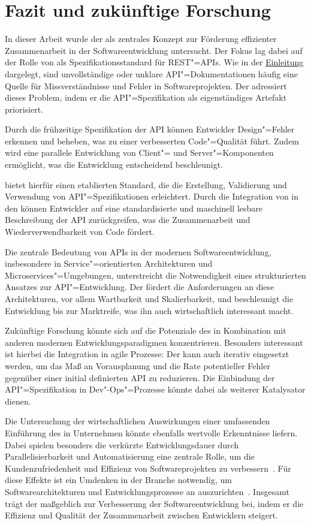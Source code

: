 \chapter{Fazit und zukünftige Forschung}
In dieser Arbeit wurde der \AFA als zentrales Konzept zur Förderung effizienter Zusammenarbeit in der Softwareentwicklung untersucht.
Der Fokus lag dabei auf der Rolle von \OA als Spezifikationsstandard für \ac{REST}"=\acp{API}.
Wie in der \hyperref[ch:introduction]{Einleitung} dargelegt, sind unvollständige oder unklare \ac{API}"=Dokumentationen häufig eine Quelle für Missverständnisse und Fehler in Softwareprojekten.
Der \AFA adressiert dieses Problem, indem er die \ac{API}"=Spezifikation als eigenständiges Artefakt priorisiert.

Durch die frühzeitige Spezifikation der \ac{API} können Entwickler Design"=Fehler erkennen und beheben, was zu einer verbesserten Code"=Qualität führt.
Zudem wird eine parallele Entwicklung von Client"= und Server"=Komponenten ermöglicht, was die Entwicklung entscheidend beschleunigt.

\OA bietet hierfür einen etablierten Standard, die die Erstellung, Validierung und Verwendung von \ac{API}"=Spezifikationen erleichtert.
Durch die Integration von \OA in den \AFA können Entwickler auf eine standardisierte und maschinell lesbare Beschreibung der \ac{API} zurückgreifen, was die Zusammenarbeit und Wiederverwendbarkeit von Code fördert.

Die zentrale Bedeutung von \acp{API} in der modernen Softwareentwicklung, insbesondere in Service"=orientierten Architekturen und Microservices"=Umgebungen, unterstreicht die Notwendigkeit eines strukturierten Ansatzes zur \ac{API}"=Entwicklung.
Der \AFA fördert die Anforderungen an diese Architekturen, vor allem Wartbarkeit und Skalierbarkeit, und beschleunigt die Entwicklung bis zur Marktreife, was ihn auch wirtschaftlich interessant macht.

Zukünftige Forschung könnte sich auf die Potenziale des \AFAes in Kombination mit anderen modernen Entwicklungsparadigmen konzentrieren.
Besonders interessant ist hierbei die Integration in agile Prozesse: 
Der \AFA kann auch iterativ eingesetzt werden, um das Maß an Vorausplanung und die Rate potentieller Fehler gegenüber einer initial definierten \ac{API} zu reduzieren.
Die Einbindung der \ac{API}"=Spezifikation in Dev"-Ops"=Prozesse könnte dabei als weiterer Katalysator dienen.

Die Untersuchung der wirtschaftlichen Auswirkungen einer umfassenden Einführung des \AFAes in Unternehmen könnte ebenfalls wertvolle Erkenntnisse liefern.
Dabei spielen besonders die verkürzte Entwicklungsdauer durch Parallelisierbarkeit und Automatisierung eine zentrale Rolle, um die Kundenzufriedenheit und Effizienz von Softwareprojekten zu verbessern~\cites[77]{bea22}[355,360]{de23}.
Für diese Effekte ist ein Umdenken in der Branche notwendig, um Softwarearchitekturen und Entwicklungsprozesse an \AF auszurichten~\cites[2]{kul23}[361]{de23}.
Insgesamt trägt der \AFA maßgeblich zur Verbesserung der Softwareentwicklung bei, indem er die Effizienz und Qualität der Zusammenarbeit zwischen Entwicklern steigert.